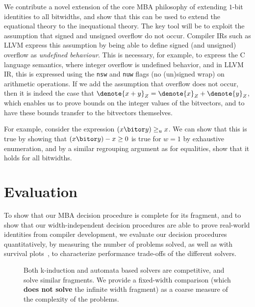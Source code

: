 We contribute a novel extension of the core MBA philosophy of extending $1$-bit identities to all bitwidths,
and show that this can be used to extend the equational theory to the inequational theory.
The key tool will be to exploit the assumption that signed and unsigned overflow do not occur.
Compiler IRs such as LLVM express this assumption by being able to define signed (and unsigned) overflow as \emph{undefined behaviour}.
This is necessary, for example, to express the C language semantics, where integer overflow is undefined behavior,
and in LLVM IR, this is expressed using the \texttt{nsw} and \texttt{nuw} flags (no (un)signed wrap) on arithmetic operations.
If we add the assumption that overflow does not occur, then it is indeed the case that $\denote{x + y}_Z = \denote{x}_Z + \denote{y}_Z$,
which enables us to prove bounds on the integer values of the bitvectors, and to have these bounds transfer to the bitvectors themselves.

For example, consider the expression $(x \bitor y) \geq_u x$.
We can show that this is true by showing that $(x \bitor y) - x \geq 0$ is true for $w = 1$ by exhaustive enumeration,
and by a similar regrouping argument as for equalities, show that it holds for all bitwidths.

\section{Evaluation}
\label{sec:swbv:evaluation}

To show that our MBA decision procedure is complete for its fragment,
and to show that our width-independent decision procedures are able to prove real-world identities from compiler development,
we evaluate our decision procedures quantitatively, by measuring the number of problems solved,
as well as with survival plots~\cite{brain2017benchmarking}, to characterize performance trade-offs of the different solvers.

\begin{figure}[htb]
{\small
{}
}
\caption{Both k-induction and automata based solvers are competitive, and solve similar fragments.
  We provide a fixed-width comparison (which \textbf{does not solve} the infinite width fragment)
  as a coarse measure of the complexity of the problems.}
\label{fig:swbv:table-eval}
\end{figure}

